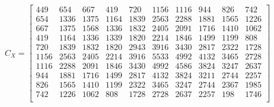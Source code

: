 \begin{equation}
C_X = \begin{bmatrix}
449 & 654 & 667 & 419 & 720 & 1156 & 1116 & 944 & 826 & 742\\
654 & 1336 & 1375 & 1164 & 1839 & 2563 & 2288 & 1881 & 1565 & 1226\\
667 & 1375 & 1568 & 1336 & 1832 & 2405 & 2091 & 1716 & 1410 & 1062\\
419 & 1164 & 1336 & 1339 & 1820 & 2214 & 1846 & 1499 & 1199 & 808\\
720 & 1839 & 1832 & 1820 & 2943 & 3916 & 3430 & 2817 & 2322 & 1728\\
1156 & 2563 & 2405 & 2214 & 3916 & 5533 & 4992 & 4132 & 3465 & 2728\\
1116 & 2288 & 2091 & 1846 & 3430 & 4992 & 4586 & 3824 & 3247 &   2637\\
944 & 1881 & 1716 & 1499 & 2817 & 4132 & 3824 & 3211 & 2744 & 2257\\
826 & 1565 & 1410 & 1199 & 2322 & 3465 & 3247 & 2744 & 2367 & 1985\\
742 & 1226 & 1062 & 808 & 1728 & 2728 & 2637 & 2257 & 198 & 1746\\
\end{bmatrix}
\end{equation}

